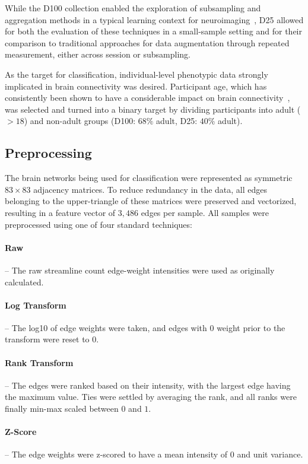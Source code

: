 \documentclass[10pt]{SelfArx} %
\begin{document}
While the D100 collection enabled the exploration of subsampling and aggregation methods in a typical learning context
for neuroimaging~\cite{Dimitriadis2017-pd,Buchanan2014-pm}, D25 allowed for both the evaluation of these techniques in
a small-sample setting and for their comparison to traditional approaches for data augmentation through repeated
measurement, either across session or subsampling.

As the target for classification, individual-level phenotypic data strongly implicated in brain connectivity was
desired. Participant age, which has consistently been shown to have a considerable impact on brain
connectivity~\cite{Meier2012-ve,Wu2012-uc,Bookheimer2019-ti,Zhao2015-rm}, was selected and turned into a binary target
by dividing participants into adult ($>18$) and non-adult groups (D100: $68\%$ adult, D25: $40\%$ adult).

\subsection*{Preprocessing}
The brain networks being used for classification were represented as symmetric $83 \times 83$ adjacency matrices. To
reduce redundancy in the data, all edges belonging to the upper-triangle of these matrices were preserved and
vectorized, resulting in a feature vector of $3,486$ edges per sample. All samples were preprocessed using one of four
standard techniques:

\paragraph{Raw} – The raw streamline count edge-weight intensities were used as originally calculated.

\paragraph{Log Transform} – The log10 of edge weights were taken, and edges with $0$ weight prior to the transform were
reset to $0$.

\paragraph{Rank Transform} – The edges were ranked based on their intensity, with the largest edge having the maximum
value. Ties were settled by averaging the rank, and all ranks were finally min-max scaled between $0$ and $1$.

\paragraph{Z-Score} – The edge weights were z-scored to have a mean intensity of $0$ and unit variance.
\end{document}
